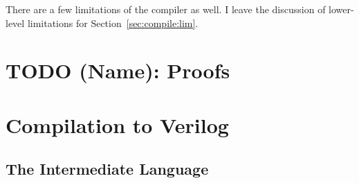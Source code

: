 \documentclass[sigconf,usenames,dvipsnames,svgnames,table]{acmart}
\begin{document}
      There are a few limitations of the compiler as well.
      I leave the discussion of lower-level limitations for Section~\ref{sec:compile:lim}.
  \section{TODO (Name): Proofs}\label{sec:proofs}






  \section{Compilation to Verilog}\label{sec:comp}
    \subsection{The Intermediate Language}\label{sec:comp:int}
\end{document}
